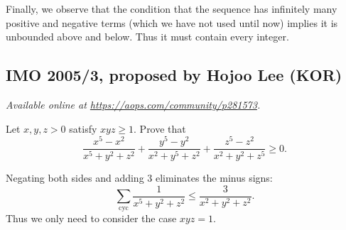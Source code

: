 \documentclass[11pt]{scrartcl}
\begin{document}
Finally, we observe that the condition that
the sequence has infinitely many positive and negative terms
(which we have not used until now)
implies it is unbounded above and below.
Thus it must contain every integer.
\pagebreak

\subsection{IMO 2005/3, proposed by Hojoo Lee (KOR)}
\textsl{Available online at \url{https://aops.com/community/p281573}.}
\begin{mdframed}[style=mdpurplebox,frametitle={Problem statement}]
Let $x,y,z > 0$ satisfy $xyz\geq 1$. Prove that
\[ \frac { x^5-x^2 }{x^5+y^2+z^2}
  + \frac {y^5-y^2}{x^2+y^5+z^2}
  + \frac {z^5-z^2}{x^2+y^2+z^5} \geq 0. \]
\end{mdframed}
Negating both sides and adding $3$ eliminates the minus signs:
\[ \sum_{\text{cyc}} \frac{1}{x^5+y^2+z^2}
  \le \frac{3}{x^2+y^2+z^2}. \]
Thus we only need to consider the case $xyz = 1$.
\end{document}
